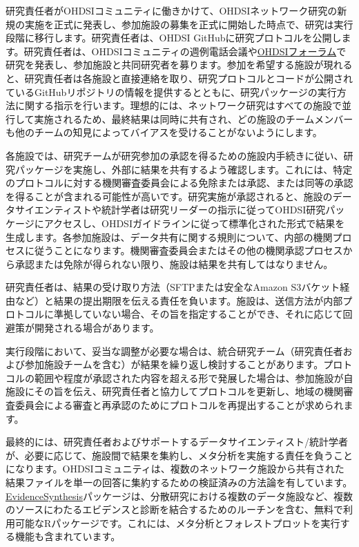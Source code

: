 \documentclass[
  11pt]{book}
\theoremstyle{definition}
\theoremstyle{definition}
\theoremstyle{definition}
\theoremstyle{definition}
\theoremstyle{remark}
\begin{document}
研究責任者がOHDSIコミュニティに働きかけて、OHDSIネットワーク研究の新規の実施を正式に発表し、参加施設の募集を正式に開始した時点で、研究は実行段階に移行します。研究責任者は、OHDSI GitHubに研究プロトコルを公開します。研究責任者は、OHDSIコミュニティの週例電話会議や\href{http://forums.ohdsi.org/}{OHDSIフォーラム}で研究を発表し、参加施設と共同研究者を募ります。参加を希望する施設が現れると、研究責任者は各施設と直接連絡を取り、研究プロトコルとコードが公開されているGitHubリポジトリの情報を提供するとともに、研究パッケージの実行方法に関する指示を行います。理想的には、ネットワーク研究はすべての施設で並行して実施されるため、最終結果は同時に共有され、どの施設のチームメンバーも他のチームの知見によってバイアスを受けることがないようにします。

各施設では、研究チームが研究参加の承認を得るための施設内手続きに従い、研究パッケージを実施し、外部に結果を共有するよう確認します。これには、特定のプロトコルに対する機関審査委員会による免除または承認、または同等の承認を得ることが含まれる可能性が高いです。研究実施が承認されると、施設のデータサイエンティストや統計学者は研究リーダーの指示に従ってOHDSI研究パッケージにアクセスし、OHDSIガイドラインに従って標準化された形式で結果を生成します。各参加施設は、データ共有に関する規則について、内部の機関プロセスに従うことになります。機関審査委員会またはその他の機関承認プロセスから承認または免除が得られない限り、施設は結果を共有してはなりません。

研究責任者は、結果の受け取り方法（SFTPまたは安全なAmazon S3バケット経由など）と結果の提出期限を伝える責任を負います。施設は、送信方法が内部プロトコルに準拠していない場合、その旨を指定することができ、それに応じて回避策が開発される場合があります。

実行段階において、妥当な調整が必要な場合は、統合研究チーム（研究責任者および参加施設チームを含む）が結果を繰り返し検討することがあります。プロトコルの範囲や程度が承認された内容を超える形で発展した場合は、参加施設が自施設にその旨を伝え、研究責任者と協力してプロトコルを更新し、地域の機関審査委員会による審査と再承認のためにプロトコルを再提出することが求められます。

最終的には、研究責任者およびサポートするデータサイエンティスト/統計学者が、必要に応じて、施設間で結果を集約し、メタ分析を実施する責任を負うことになります。OHDSIコミュニティは、複数のネットワーク施設から共有された結果ファイルを単一の回答に集約するための検証済みの方法論を有しています。\href{https://github.com/OHDSI/EvidenceSynthesis}{EvidenceSynthesis}パッケージは、分散研究における複数のデータ施設など、複数のソースにわたるエビデンスと診断を結合するためのルーチンを含む、無料で利用可能なRパッケージです。これには、メタ分析とフォレストプロットを実行する機能も含まれています。
\end{document}

